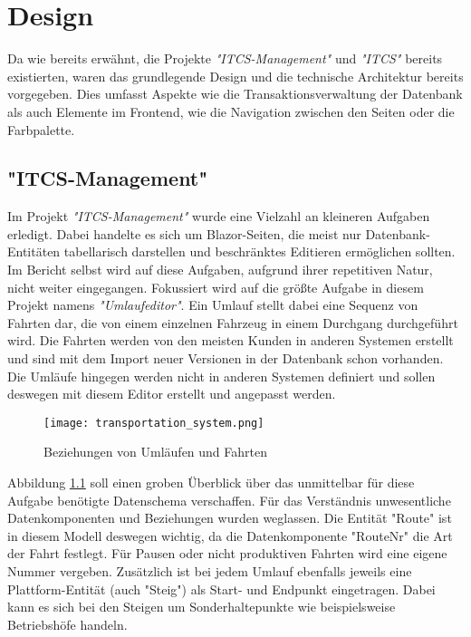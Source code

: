 \chapter{Design}\label{chap:design}

    Da wie bereits erwähnt, die Projekte \emph{"ITCS-Management"} und \emph{"ITCS"} bereits existierten, waren das grundlegende Design und die technische Architektur bereits vorgegeben.
    Dies umfasst Aspekte wie die Transaktionsverwaltung der Datenbank als auch Elemente im Frontend, wie die Navigation zwischen den Seiten oder die Farbpalette.

\section{"ITCS-Management"}\label{sec:itcs-management-design}
    Im Projekt \emph{"ITCS-Management"} wurde eine Vielzahl an kleineren Aufgaben erledigt. Dabei handelte es sich um Blazor-Seiten, die meist nur Datenbank-Entitäten tabellarisch
    darstellen und beschränktes Editieren ermöglichen sollten. Im Bericht selbst wird auf diese Aufgaben, aufgrund ihrer repetitiven Natur, nicht weiter eingegangen. Fokussiert wird  
    auf die größte Aufgabe in diesem Projekt namens \emph{"Umlaufeditor"}. 
    Ein Umlauf stellt dabei eine Sequenz von Fahrten dar, die von einem einzelnen Fahrzeug in einem Durchgang durchgeführt wird. Die Fahrten werden von den meisten Kunden in anderen 
    Systemen erstellt und sind mit dem Import neuer Versionen in der Datenbank schon vorhanden. Die Umläufe hingegen werden nicht in anderen Systemen definiert und sollen deswegen
    mit diesem Editor erstellt und angepasst werden. 
    \begin{figure}[H]
        \centering
        \texttt{[image: transportation\_system.png]}
        \caption{Beziehungen von Umläufen und Fahrten}
        \label{fig:BeziehungenvonUmläufenundFahrten}
    \end{figure}

    Abbildung \ref{fig:BeziehungenvonUmläufenundFahrten} soll einen groben Überblick über das unmittelbar für diese Aufgabe benötigte Datenschema verschaffen. Für das Verständnis unwesentliche 
    Datenkomponenten und Beziehungen wurden weglassen. Die Entität "Route" ist in diesem Modell deswegen wichtig, da die Datenkomponente "RouteNr" die Art der Fahrt festlegt. Für Pausen oder nicht produktiven
    Fahrten wird eine eigene Nummer vergeben. Zusätzlich ist bei jedem Umlauf ebenfalls jeweils eine Plattform-Entität (auch "Steig") als Start- und Endpunkt eingetragen. Dabei kann es sich bei den 
    Steigen um Sonderhaltepunkte wie beispielsweise Betriebshöfe handeln.

